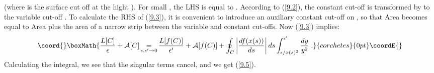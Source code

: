 \documentclass[a4paper,12pt]{article}
\numberwithin{equation}{section}
\begin{document}
(where \coordHE{} is the surface \coordHE{} cut off at the hight \myHighlight{\( \epsilon  \)}\coordHE{}).
For small \myHighlight{\( \epsilon  \)}\coordHE{}, the LHS is equal to \coordHE{}.
According to (\ref{9.2}), the constant cut-off \myHighlight{\( \epsilon  \)}\coordHE{} is transformed
by \coordHE{} to the variable cut-off \coordHE{}. To calculate the
RHS of (\ref{9.3}), it is convenient to introduce an auxiliary constant cut-off
\coordHE{} on \coordHE{}, so that Area\myHighlight{\( [F(M_{\epsilon })] \)}\coordHE{} becomes
equal to Area\myHighlight{\( [F(M)_{\epsilon '}] \)}\coordHE{} plus the area of a narrow strip between
the variable and constant cut-offs. Now (\ref{9.3}) implies:
\[\coord{}\boxMath{
\frac{L[C]}{\epsilon }+\mathcal{A}[C]\mathop {=}_{\epsilon ,\epsilon '\to 0}\frac{L[f(C)]}{\epsilon '}+\mathcal{A}[f(C)]+\oint _{C}\left| \frac{df(x(s))}{ds}\right| ds\int _{\epsilon /x(s)^{2}}^{\epsilon '}\frac{dy}{y^{2}}\; .}{corchetes}{0pt}\coordE{}\]
 Calculating the integral, we see that the singular terms cancel, and we get
(\ref{9.5}). 
\end{document}
